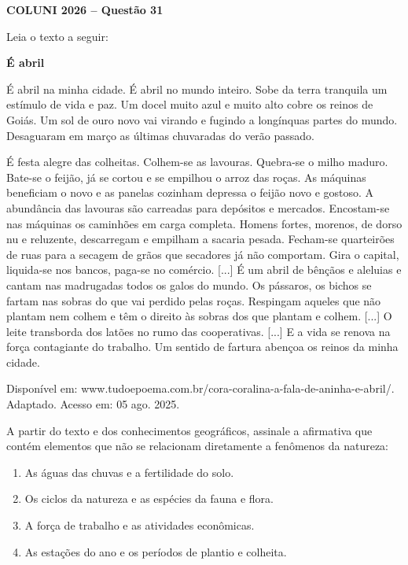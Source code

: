 \textbf{COLUNI 2026 -- Questão 31}\par\medskip Leia o texto a seguir:

\textbf{É abril}

É abril na minha cidade.
É abril no mundo inteiro.
Sobe da terra tranquila um estímulo de vida e paz.
Um docel muito azul e muito alto cobre os reinos de Goiás.
Um sol de ouro novo vai virando e fugindo a longínquas partes do mundo.
Desaguaram em março as últimas chuvaradas do verão passado.

É festa alegre das colheitas.
Colhem-se as lavouras.
Quebra-se o milho maduro.
Bate-se o feijão,
já se cortou e se empilhou o arroz das roças.
As máquinas beneficiam o novo
e as panelas cozinham depressa o feijão novo e gostoso.
A abundância das lavouras são carreadas para depósitos e mercados.
Encostam-se nas máquinas os caminhões em carga completa.
Homens fortes, morenos, de dorso nu e reluzente,
descarregam e empilham a sacaria pesada.
Fecham-se quarteirões de ruas para a secagem de grãos
que secadores já não comportam.
Gira o capital, liquida-se nos bancos, paga-se no comércio. [...]
É um abril de bênçãos e aleluias
e cantam nas madrugadas todos os galos do mundo.
Os pássaros, os bichos se fartam nas sobras do que vai perdido pelas roças.
Respingam aqueles que não plantam nem colhem
e têm o direito às sobras dos que plantam e colhem. [...]
O leite transborda dos latões no rumo das cooperativas. [...]
E a vida se renova na força contagiante do trabalho.
Um sentido de fartura abençoa os reinos da minha cidade.\par
Disponível em: www.tudoepoema.com.br/cora-coralina-a-fala-de-aninha-e-abril/. Adaptado. Acesso em: 05 ago. 2025.

A partir do texto e dos conhecimentos geográficos, assinale a afirmativa que contém elementos que não se relacionam diretamente a fenômenos da natureza:\begin{enumerate}
\item As águas das chuvas e a fertilidade do solo.
\item Os ciclos da natureza e as espécies da fauna e flora.
\item A força de trabalho e as atividades econômicas.
\item As estações do ano e os períodos de plantio e colheita.\end{enumerate}